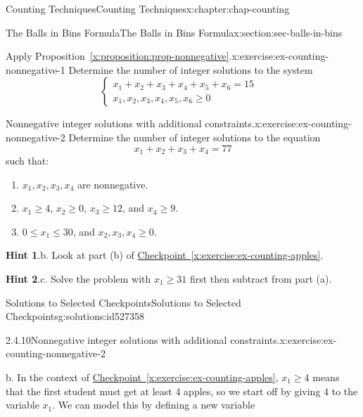 \documentclass[oneside,10pt,]{book}
\newcommand{\blocktitlefont}{\relax}
\newcommand{\xreffont}{\relax}
\numberwithin{equation}{section}
\newcommand{\amp}{&}
\begin{document}
\begin{chapterptx}{Counting Techniques}{}{Counting Techniques}{}{}{x:chapter:chap-counting}
\begin{sectionptx}{The Balls in Bins Formula}{}{The Balls in Bins Formula}{}{}{x:section:sec-balls-in-bins}
\begin{inlineexercise}{Apply Proposition~{\xreffont\ref*{x:proposition:prop-nonnegative}}.}{x:exercise:ex-counting-nonnegative-1}%
Determine the number of integer solutions to the system%
\begin{equation*}
\begin{cases}
x_1 + x_2 + x_3 + x_4 + x_5 + x_6 = 15 \amp \\ x_1, x_2, x_3, x_4, x_5, x_6 \geq 0 \amp
\end{cases}
\end{equation*}
%
\end{inlineexercise}%
\begin{inlineexercise}{Nonnegative integer solutions with additional constraints.}{x:exercise:ex-counting-nonnegative-2}%
Determine the number of integer solutions to the equation%
\begin{equation*}
x_1 + x_2 + x_3 + x_4 = 77
\end{equation*}
such that:%
\begin{enumerate}[label=(\alph*)]
\item{}\(x_1, x_2, x_3, x_4\) are nonnegative.%
\item{}\(x_1 \geq 4\), \(x_2 \geq 0\), \(x_3 \geq 12\), and \(x_4 \geq 9\).%
\item{}\(0 \leq x_1 \leq 30\), and \(x_2, x_3, x_4 \geq 0\).%
\end{enumerate}
%
\par\smallskip%
\noindent\textbf{\blocktitlefont Hint 1}.\hypertarget{g:hint:id527291}{}\quad{}b. Look at part (b) of \hyperref[x:exercise:ex-counting-apples]{Checkpoint~{\xreffont\ref{x:exercise:ex-counting-apples}}}.%
\par\smallskip%
\noindent\textbf{\blocktitlefont Hint 2}.\hypertarget{g:hint:id527285}{}\quad{}c. Solve the problem with \(x_1 \geq 31\) first then subtract from part (a).%
\end{inlineexercise}%
%
%
\typeout{************************************************}
\typeout{************************************************}
%
\begin{solutions-subsection-numberless}{Solutions to Selected Checkpoints}{}{Solutions to Selected Checkpoints}{}{}{g:solutions:id527358}
\begin{inlinesolution}{2.4.10}{Nonnegative integer solutions with additional constraints.}{x:exercise:ex-counting-nonnegative-2}%
\par\smallskip%
\noindent\hypertarget{g:solution:id527294-main}{}b. In the context of \hyperref[x:exercise:ex-counting-apples]{Checkpoint~{\xreffont\ref{x:exercise:ex-counting-apples}}}, \(x_1 \geq 4\) means that the first student must get at least 4 apples, so we start off by giving 4 to the variable \(x_1\). We can model this by defining a new variable%

\end{inlinesolution}
\end{solutions-subsection-numberless}
\end{sectionptx}
\end{chapterptx}
\end{document}
